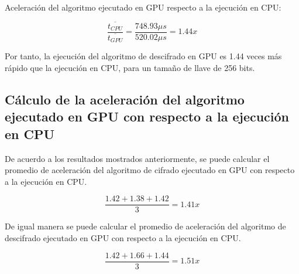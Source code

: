 \documentclass[../main/main.tex]{subfiles}
\begin{document}
        Aceleración del algoritmo ejecutado en GPU respecto a la ejecución en CPU:

        \vspace{-0.7cm}\begin{equation}
          \frac{\overline{t_{CPU}}}{\overline{t_{GPU}}} = \frac{748.93\mu s}{520.02\mu s} = 1.44x
        \end{equation}

        Por tanto, la ejecución del algoritmo de descifrado en GPU es 1.44 veces más rápido que la ejecución en CPU, para un tamaño de llave de 256 bits.

    \subsection{Cálculo de la aceleración del algoritmo ejecutado en GPU con respecto a la ejecución en CPU}

        De acuerdo a los resultados mostrados anteriormente, se puede calcular el promedio de aceleración del algoritmo de cifrado ejecutado en GPU con respecto a la ejecución en CPU.

        \vspace{-0.7cm}\begin{equation}
          \frac{1.42 + 1.38 + 1.42}{3} = 1.41x
        \end{equation}

        De igual manera se puede calcular el promedio de aceleración del algoritmo de descifrado ejecutado en GPU con respecto a la ejecución en CPU.

        \vspace{-0.7cm}\begin{equation}
          \frac{1.42 + 1.66 + 1.44}{3} = 1.51x
        \end{equation}
\end{document}
